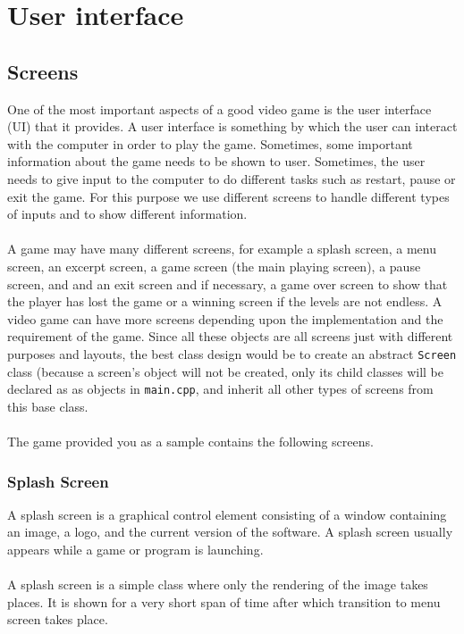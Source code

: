 \documentclass[11pt,fleqn]{book} %
\begin{document}
\chapter{User interface} %
    \section{Screens}
    One of the most important aspects of a good video game is the user interface (UI) that it provides. A user interface is something by which the user can interact with the computer in order to play the game. Sometimes, some important information about the game needs to be shown to user. Sometimes, the user needs to give input to the computer to do different tasks such as restart, pause or exit the game. For this purpose we use different screens to handle different types of inputs and to show different information. \\
    \\
    A game may have many different screens, for example a splash screen, a menu screen, an excerpt screen, a game screen (the main playing screen), a pause screen, and and an exit screen and if necessary, a game over screen to show that the player has lost the game or a winning screen if the levels are not endless. A video game can have more screens depending upon the implementation and the requirement of the game. Since all these objects are all screens just with different purposes and layouts, the best class design would be to create an abstract \texttt{Screen} class (because a screen's object will not be created, only its child classes will be declared as as objects in \texttt{main.cpp}, and inherit all other types of screens from this base class. \\ \\
    The game provided you as a sample contains the following screens.
\subsection{Splash Screen}
        A splash screen is a graphical control element consisting of a window containing an image, a logo, and the current version of the software. A splash screen usually appears while a game or program is launching. \\  \\
A splash screen is a simple class where only the rendering of the image takes places.
It is shown for a very short span of time after which transition to menu screen takes place.
\end{document}
